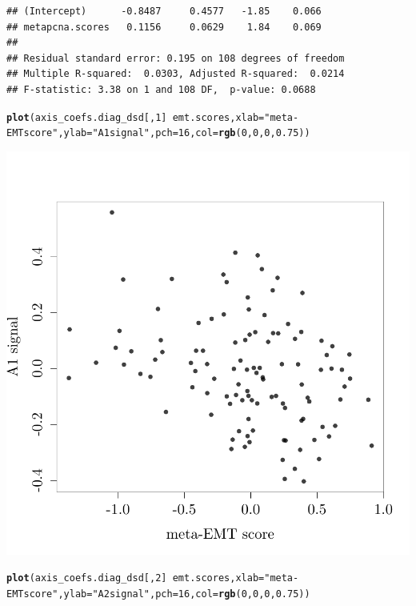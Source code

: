 \documentclass{article}\usepackage[]{graphicx}\usepackage[]{color}
\makeatletter
\def\maxwidth{ %
  \ifdim\Gin@nat@width>\linewidth
    \linewidth
  \else
    \Gin@nat@width
  \fi
}
\newcommand{\hlnum}[1]{\textcolor[rgb]{0.686,0.059,0.569}{#1}}%
\newcommand{\hlstr}[1]{\textcolor[rgb]{0.192,0.494,0.8}{#1}}%
\newcommand{\hlopt}[1]{\textcolor[rgb]{0,0,0}{#1}}%
\newcommand{\hlstd}[1]{\textcolor[rgb]{0.345,0.345,0.345}{#1}}%
\newcommand{\hlkwc}[1]{\textcolor[rgb]{0.333,0.667,0.333}{#1}}%
\newcommand{\hlkwd}[1]{\textcolor[rgb]{0.737,0.353,0.396}{\textbf{#1}}}%
\newenvironment{kframe}{%
 \def\at@end@of@kframe{}%
 \ifinner\ifhmode%
  \def\at@end@of@kframe{\end{minipage}}%
  \begin{minipage}{\columnwidth}%
 \fi\fi%
 \def\FrameCommand##1{\hskip\@totalleftmargin \hskip-\fboxsep
 \colorbox{shadecolor}{##1}\hskip-\fboxsep
     \hskip-\linewidth \hskip-\@totalleftmargin \hskip\columnwidth}%
 \MakeFramed {\advance\hsize-\width
   \@totalleftmargin\z@ \linewidth\hsize
   \@setminipage}}%
 {\par\unskip\endMakeFramed%
 \at@end@of@kframe}
\newenvironment{knitrout}{}{} %
\makeatother
\begin{document}
\begin{knitrout}
\begin{kframe}
\begin{verbatim}
## (Intercept)      -0.8487     0.4577   -1.85    0.066
## metapcna.scores   0.1156     0.0629    1.84    0.069
## 
## Residual standard error: 0.195 on 108 degrees of freedom
## Multiple R-squared:  0.0303,	Adjusted R-squared:  0.0214 
## F-statistic: 3.38 on 1 and 108 DF,  p-value: 0.0688
\end{verbatim}
\begin{alltt}
\hlkwd{plot}\hlstd{(axis_coefs.diag_dsd[,}\hlnum{1}\hlstd{]} \hlopt{~} \hlstd{emt.scores,} \hlkwc{xlab} \hlstd{=} \hlstr{"meta-EMT score"}\hlstd{,} \hlkwc{ylab} \hlstd{=} \hlstr{"A1 signal"}\hlstd{,} \hlkwc{pch} \hlstd{=} \hlnum{16}\hlstd{,} \hlkwc{col} \hlstd{=} \hlkwd{rgb}\hlstd{(}\hlnum{0}\hlstd{,} \hlnum{0}\hlstd{,} \hlnum{0}\hlstd{,} \hlnum{0.75}\hlstd{))}
\end{alltt}
\end{kframe}

{\centering \includegraphics[width=\maxwidth]{figure/nmf-msigdb-cor-plots-7} 

}


\begin{kframe}\begin{alltt}
\hlkwd{plot}\hlstd{(axis_coefs.diag_dsd[,}\hlnum{2}\hlstd{]} \hlopt{~} \hlstd{emt.scores,} \hlkwc{xlab} \hlstd{=} \hlstr{"meta-EMT score"}\hlstd{,} \hlkwc{ylab} \hlstd{=} \hlstr{"A2 signal"}\hlstd{,} \hlkwc{pch} \hlstd{=} \hlnum{16}\hlstd{,} \hlkwc{col} \hlstd{=} \hlkwd{rgb}\hlstd{(}\hlnum{0}\hlstd{,} \hlnum{0}\hlstd{,} \hlnum{0}\hlstd{,} \hlnum{0.75}\hlstd{))}
\end{alltt}
\end{kframe}


\end{knitrout}
\end{document}
